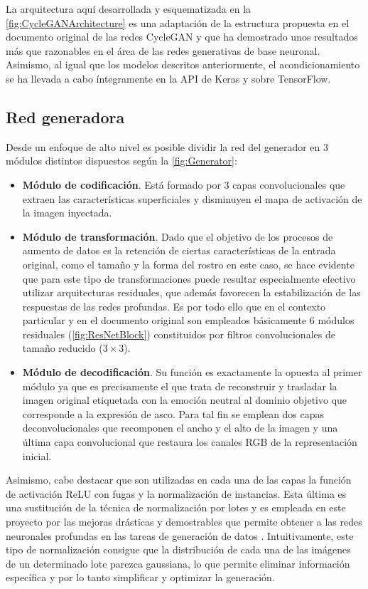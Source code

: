 La arquitectura aquí desarrollada y esquematizada en la \autoref{fig:CycleGANArchitecture} es una adaptación de la estructura propuesta en el documento original de las redes CycleGAN y que ha demostrado unos resultados más que razonables en el área de las redes generativas de base neuronal. Asimismo, al igual que los modelos descritos anteriormente, el acondicionamiento se ha llevada a cabo íntegramente en la API de Keras y sobre TensorFlow.

\subsection{Red generadora}

Desde un enfoque de alto nivel es posible dividir la red del generador en 3 módulos distintos dispuestos según la \autoref{fig:Generator}:
\begin{itemize}
    \item \textbf{Módulo de codificación}. Está formado por 3 capas convolucionales que extraen las características superficiales y disminuyen el mapa de activación de la imagen inyectada.
    \item \textbf{Módulo de transformación}. Dado que el objetivo de los procesos de aumento de datos es la retención de ciertas características de la entrada original, como el tamaño y la forma del rostro en este caso, se hace evidente que para este tipo de transformaciones puede resultar especialmente efectivo utilizar arquitecturas residuales, que además favorecen la estabilización de las respuestas de las redes profundas. Es por todo ello que en el contexto particular y en el documento original son empleados básicamente 6 módulos residuales (\autoref{fig:ResNetBlock}) constituidos por filtros convolucionales de tamaño reducido ($3\times 3$).
    \item \textbf{Módulo de decodificación}. Su función es exactamente la opuesta al primer módulo ya que es precisamente el que trata de reconstruir y trasladar la imagen original etiquetada con la emoción neutral al dominio objetivo que corresponde a la expresión de asco. Para tal fin se emplean dos capas deconvolucionales que recomponen el ancho y el alto de la imagen y una última capa convolucional que restaura los canales RGB de la representación inicial.
\end{itemize}

Asimismo, cabe destacar que son utilizadas en cada una de las capas la función de activación ReLU con fugas y la normalización de instancias. Esta última es una sustitución de la técnica de normalización por lotes y es empleada en este proyecto por las mejoras drásticas y demostrables que permite obtener a las redes neuronales profundas en las tareas de generación de datos \cite{InstanceNormalization}. Intuitivamente, este tipo de normalización consigue que la distribución de cada una de las imágenes de un determinado lote parezca gaussiana, lo que permite eliminar información específica y por lo tanto simplificar y optimizar la generación.

